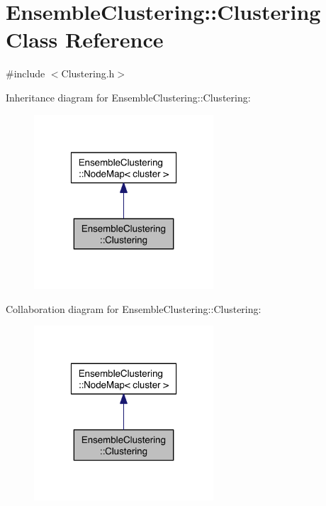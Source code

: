 \hypertarget{class_ensemble_clustering_1_1_clustering}{\section{Ensemble\-Clustering\-:\-:Clustering Class Reference}
\label{class_ensemble_clustering_1_1_clustering}
}


{\ttfamily \#include $<$Clustering.\-h$>$}



Inheritance diagram for Ensemble\-Clustering\-:\-:Clustering\-:\nopagebreak
\begin{figure}[H]
\begin{center}
\leavevmode
\includegraphics[width=190pt]{class_ensemble_clustering_1_1_clustering__inherit__graph}
\end{center}
\end{figure}


Collaboration diagram for Ensemble\-Clustering\-:\-:Clustering\-:\nopagebreak
\begin{figure}[H]
\begin{center}
\leavevmode
\includegraphics[width=190pt]{class_ensemble_clustering_1_1_clustering__coll__graph}
\end{center}
\end{figure}
